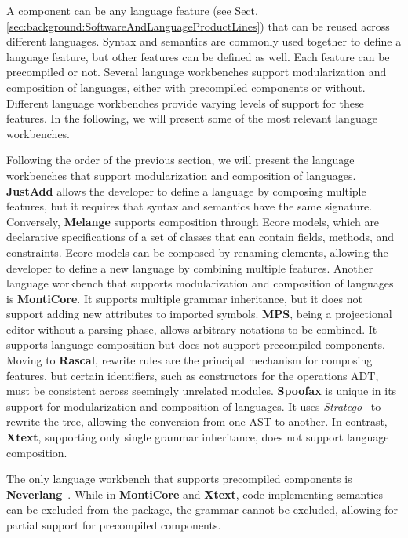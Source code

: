 A component can be any language feature (see Sect.\ref{sec:background:SoftwareAndLanguageProductLines}) that can be reused across different languages. Syntax and semantics are commonly used together to define a language feature, but other features can be defined as well. Each feature can be precompiled\cite{Cazzola13e} or not. Several language workbenches support modularization and composition of languages, either with precompiled components or without. Different language workbenches provide varying levels of support for these features. In the following, we will present some of the most relevant language workbenches.

Following the order of the previous section, we will present the language workbenches that support modularization and composition of languages. \textbf{JustAdd} allows the developer to define a language by composing multiple features, but it requires that syntax and semantics have the same signature. Conversely, \textbf{Melange} supports composition through Ecore models, which are declarative specifications of a set of classes that can contain fields, methods, and constraints. Ecore models can be composed by renaming elements, allowing the developer to define a new language by combining multiple features. Another language workbench that supports modularization and composition of languages is \textbf{MontiCore}. It supports multiple grammar inheritance, but it does not support adding new attributes to imported symbols. \textbf{MPS}, being a projectional editor without a parsing phase, allows arbitrary notations to be combined. It supports language composition but does not support precompiled components. Moving to \textbf{Rascal}, rewrite rules are the principal mechanism for composing features, but certain identifiers, such as constructors for the operations ADT, must be consistent across seemingly unrelated modules. \textbf{Spoofax} is unique in its support for modularization and composition of languages. It uses \textit{Stratego}~\cite{Bravenboer08} to rewrite the tree, allowing the conversion from one AST to another. In contrast, \textbf{Xtext}, supporting only single grammar inheritance, does not support language composition.

The only language workbench that supports precompiled components is \textbf{Neverlang}~\cite{Cazzola13e}. While in \textbf{MontiCore} and \textbf{Xtext}, code implementing semantics can be excluded from the package, the grammar cannot be excluded, allowing for partial support for precompiled components.

